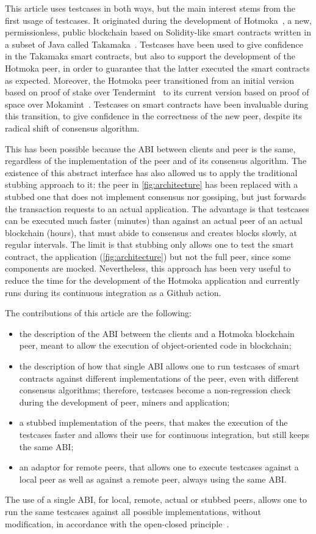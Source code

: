 This article uses testcases in both ways, but the main interest
stems from the first usage of testcases.
It originated during the development of Hotmoka~\citep{hotmoka},
a new, permissionless, public blockchain based on Solidity-like
smart contracts written in a subset of Java called Takamaka~\citep{Spoto19}.
Testcases have been used to give confidence in the Takamaka
smart contracts, but also to support the development of the Hotmoka peer,
in order to guarantee that the latter executed the smart contracts
as expected. Moreover, the Hotmoka peer transitioned from an initial
version based on proof of stake over Tendermint~\citep{Kwon14} to its
current version based on proof of space over Mokamint~\citep{mokamint}.
Testcases on smart contracts have been invaluable during this transition,
to give confidence in the correctness of the new peer, despite its
radical shift of consensus algorithm.

This has been possible because the ABI between clients and peer
is the same, regardless of the implementation of the peer and of its consensus
algorithm. The existence of this abstract interface has also allowed us
to apply the traditional stubbing approach to it: the peer
in \cref{fig:architecture} has been replaced with a stubbed one that does
not implement consensus nor gossiping, but just forwards the transaction
requests to an actual application. The advantage is that
testcases can be executed much faster (minutes) than against an actual peer
of an actual blockchain (hours),
that must abide to consensus and creates blocks slowly, at regular intervals.
The limit is that stubbing only allows one to test the smart contract,
the application
(\cref{fig:architecture}) but not the full peer, since some components are mocked.
Nevertheless, this approach has been very useful to reduce the time
for the development of the Hotmoka application and currently runs during its
continuous integration as a Github action.

The contributions of this article are the following:
%
\begin{itemize}
\item the description of the ABI between the clients and
  a Hotmoka blockchain peer, meant to allow the execution of object-oriented
  code in blockchain;
\item the description of how that single ABI allows one to
  run testcases of smart contracts
  against different implementations of the peer, even with different
  consensus algorithms; therefore, testcases become
  a non-regression check
  during the development of peer, miners and application;
\item a stubbed implementation of the peers, that makes the execution of the
  testcases faster and allows their use for continuous integration, but still keeps
  the same ABI;
\item an adaptor for remote peers, that allows one to execute testcases
  against a local peer as well as against a remote peer, always using the
  same ABI.
\end{itemize}
%
The use of a single ABI, for local, remote, actual or stubbed peers, allows one
to run the same testcases against all possible implementations, without modification,
in accordance with the open-closed principle~\citep{Meyer97}.

